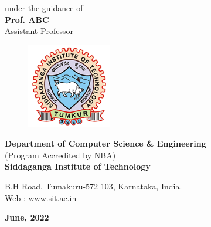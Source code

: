 \begin{titlingpage}
{\normalsize under the guidance of}\\
\Large{\textbf{Prof. ABC}}\\
Assistant Professor\\
\vfill
\begin{figure}[h]
    \centering
    \includegraphics[height=3.7cm]{images/sit.png}
\end{figure}

\textbf{Department of Computer Science \& Engineering}\\
{\normalsize (Program Accredited by NBA)} \\
\textbf{Siddaganga Institute of Technology}\\

\begin{normalsize}
B.H Road, Tumakuru-572 103, Karnataka, India.\\
Web : www.sit.ac.in \\
\end{normalsize}

\textbf{June, 2022}
\end{titlingpage}
